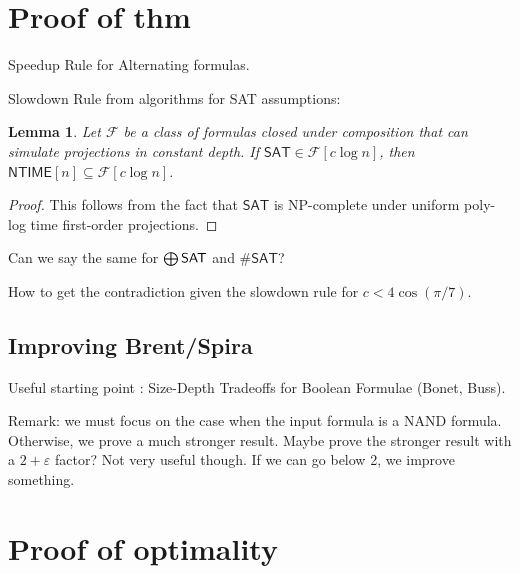 \documentclass[a4paper, 12pt]{article}
\theoremstyle{plain}
\newtheorem{lemma}[theorem]{Lemma}
\theoremstyle{definition}
\theoremstyle{remark}
\newcommand{\Ff}{\mathcal{F}}%
\newcommand{\eps}{\varepsilon}%
\newcommand{\NP}{\textsf{NP}}%
\newcommand{\NTIME}{\textsf{NTIME}}%
\newcommand{\SAT}{\textsf{SAT}}%
\newcommand{\ParSAT}{\ensuremath\bigoplus\textsf{SAT}}%
\newcommand{\SharpSAT}{\#\textsf{SAT}}%
\newcommand{\NAND}{\textsf{NAND}}%
\begin{document}
\section{Proof of thm}
Speedup Rule for Alternating formulas.

Slowdown Rule from algorithms for SAT assumptions:
\begin{lemma}
	Let $\Ff$ be a class of formulas closed under composition that can simulate projections in constant depth.
	If $\SAT\in \Ff[c \log n]$, then $\NTIME[n] \subseteq \Ff[c \log n]$.
\end{lemma}
\begin{proof}
	This follows from the fact that $\SAT$ is \NP-complete under uniform poly-log time first-order projections.
\end{proof}

Can we say the same for $\ParSAT$ and $\SharpSAT$?

How to get the contradiction given the slowdown rule for $c < 4\cos(\pi /7)$.

\subsection{Improving Brent/Spira}
Useful starting point : Size-Depth Tradeoffs for Boolean Formulae (Bonet, Buss).

Remark: we must focus on the case when the input formula is a \NAND{} formula.
Otherwise, we prove a much stronger result.
Maybe prove the stronger result with a $2+\eps$ factor? Not very useful though.
If we can go below 2, we improve something.
\section{Proof of optimality}




\end{document}

